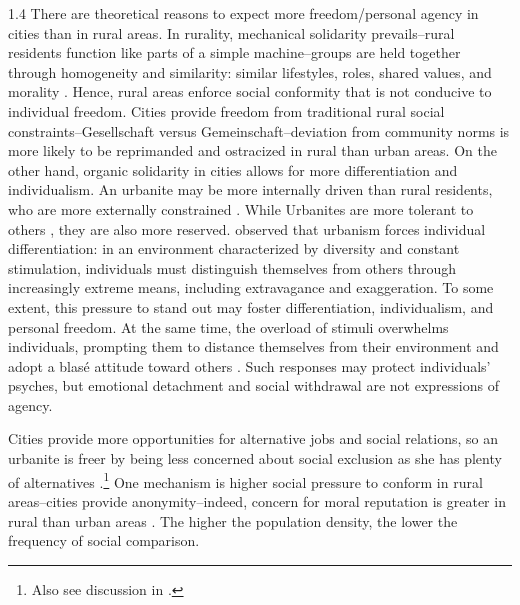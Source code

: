 \documentclass[10pt, letterpaper]{article}
\begin{document}
\begin{spacing}{1.4}
There are theoretical reasons to expect more freedom/personal agency in cities than in
rural areas. In rurality, mechanical solidarity prevails--rural residents function like parts of a simple machine--groups are held together through homogeneity and similarity:
similar lifestyles, roles, shared values, and morality
\citep{durkheim97}. Hence, rural areas enforce social conformity that is not
conducive to individual freedom.
 Cities provide freedom from traditional rural social constraints--Gesellschaft versus Gemeinschaft--deviation from community norms is more likely to be reprimanded and ostracized in rural than urban areas.
On the other hand, organic solidarity in cities allows for more differentiation and individualism. %
%
An urbanite may be more internally driven than rural residents, who are more externally constrained \citep{yamagishi12}.
%
While Urbanites are more tolerant to others \citep{tuch87},  they are also more reserved.
 \citet{simmel03}
 observed that urbanism forces individual differentiation: in an
environment characterized by diversity and constant stimulation, individuals
must distinguish themselves from others through increasingly extreme means,
including extravagance and exaggeration. To some extent, this pressure to stand
out may foster differentiation, individualism, and personal freedom. At the same
time, the overload of stimuli overwhelms individuals, prompting them to distance
themselves from their environment and adopt a blasé attitude toward others
 \citep{simmel03}. Such responses may protect individuals' psyches, but emotional
detachment and social withdrawal are not expressions of agency.




%
% 

Cities provide more opportunities for alternative jobs and social relations, so an urbanite is freer by being less concerned about social exclusion as she has plenty of alternatives \citep{yamagishi12}.\footnote{Also see discussion in \citet{luca2023progressive}.} %
 One mechanism is higher social pressure to conform in rural areas--cities provide anonymity--indeed, concern for moral reputation is greater in rural than urban areas
 \citep[][]{aokOttCh26}. %
 The higher the population density, the lower the frequency of social comparison\citep[][]{aokOttCh26}. %
 

\end{spacing}
\end{document}

